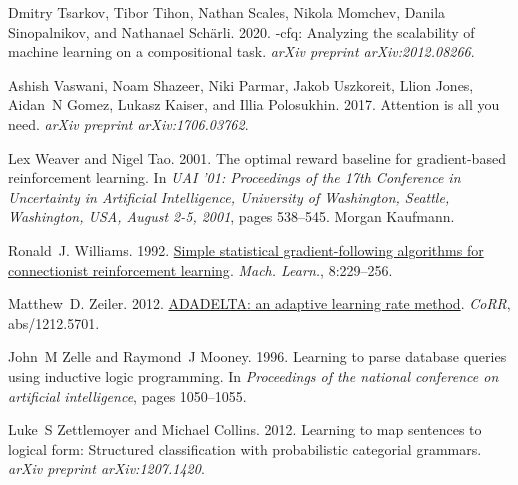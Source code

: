 \documentclass[11pt,a4paper]{article}
\begin{document}
\begin{thebibliography}{57}
Dmitry Tsarkov, Tibor Tihon, Nathan Scales, Nikola Momchev, Danila
  Sinopalnikov, and Nathanael Sch{\"a}rli. 2020.
\newblock *-cfq: Analyzing the scalability of machine learning on a
  compositional task.
\newblock \emph{arXiv preprint arXiv:2012.08266}.

Ashish Vaswani, Noam Shazeer, Niki Parmar, Jakob Uszkoreit, Llion Jones,
  Aidan~N Gomez, Lukasz Kaiser, and Illia Polosukhin. 2017.
\newblock Attention is all you need.
\newblock \emph{arXiv preprint arXiv:1706.03762}.

Lex Weaver and Nigel Tao. 2001.
\newblock The optimal reward baseline for gradient-based reinforcement
  learning.
\newblock In \emph{{UAI} '01: Proceedings of the 17th Conference in Uncertainty
  in Artificial Intelligence, University of Washington, Seattle, Washington,
  USA, August 2-5, 2001}, pages 538--545. Morgan Kaufmann.

Ronald~J. Williams. 1992.
\newblock \href {https://doi.org/10.1007/BF00992696} {Simple statistical
  gradient-following algorithms for connectionist reinforcement learning}.
\newblock \emph{Mach. Learn.}, 8:229--256.

Matthew~D. Zeiler. 2012.
\newblock \href {http://arxiv.org/abs/1212.5701} {{ADADELTA:} an adaptive
  learning rate method}.
\newblock \emph{CoRR}, abs/1212.5701.

John~M Zelle and Raymond~J Mooney. 1996.
\newblock Learning to parse database queries using inductive logic programming.
\newblock In \emph{Proceedings of the national conference on artificial
  intelligence}, pages 1050--1055.

Luke~S Zettlemoyer and Michael Collins. 2012.
\newblock Learning to map sentences to logical form: Structured classification
  with probabilistic categorial grammars.
\newblock \emph{arXiv preprint arXiv:1207.1420}.

\end{thebibliography}
 

\end{document}
